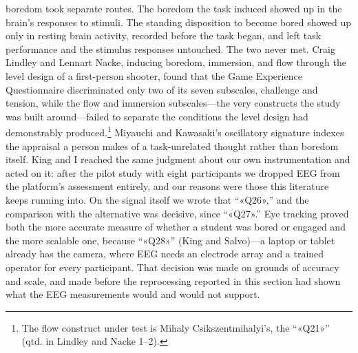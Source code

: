 boredom took separate routes. The boredom the task induced showed up in the brain's responses
to stimuli. The standing disposition to become bored showed up only in resting brain activity,
recorded before the task began, and left task performance and the stimulus responses
untouched. The two never met. Craig Lindley and Lennart Nacke, inducing boredom,
immersion, and flow through the level design of a first-person shooter, found that the Game
Experience Questionnaire discriminated only two of its seven subscales, challenge and tension,
while the flow and immersion subscales---the very constructs the study was built
around---failed to separate the conditions the level design had demonstrably
produced.\footnote{The flow construct under test is Mihaly Csikszentmihalyi's, the ``«Q21»''
(qtd. in Lindley and Nacke 1--2).} Miyauchi and Kawasaki's oscillatory signature indexes the
appraisal a person makes of a task-unrelated thought rather than boredom itself. King and I
reached the same judgment about our own instrumentation and acted on it: after the pilot study
with eight participants we dropped EEG from the platform's assessment entirely, and our
reasons were those this literature keeps running into. On the signal itself we wrote that
``«Q26»,'' and the comparison with the alternative was decisive, since ``«Q27».'' Eye tracking
proved both the more accurate measure of whether a student was bored or engaged and the more
scalable one, because ``«Q28»'' (King and Salvo)---a laptop or tablet already has the camera,
where EEG needs an electrode array and a trained operator for every participant. That decision
was made on grounds of accuracy and scale, and made before the reprocessing reported in this
section had shown what the EEG measurements would and would not support.


